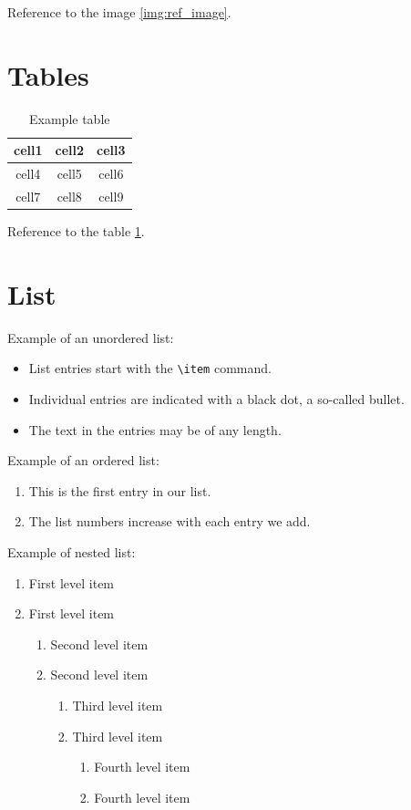 \documentclass[a4paper, oneside]{book}
\begin{document}
Reference to the image \ref{img:ref_image}.

\section{Tables}
\begin{table}
\centering
\begin{tabular}{|c|c|c|} 
 \hline
 cell1 & cell2 & cell3 \\ \hline
 cell4 & cell5 & cell6 \\ \hline
 cell7 & cell8 & cell9 \\ \hline
\end{tabular}
\caption{Example table}
\label{tab:ref_table}
\end{table}

Reference to the table \ref{tab:ref_table}.

\section{List}
Example of an unordered list:
\begin{itemize}
  \item List entries start with the \verb|\item| command.
  \item Individual entries are indicated with a black dot, a so-called bullet.
  \item The text in the entries may be of any length.
\end{itemize}

Example of an ordered list:
\begin{enumerate}
  \item This is the first entry in our list.
  \item The list numbers increase with each entry we add.
\end{enumerate}

Example of nested list:
\begin{enumerate}
   \item First level item
   \item First level item
   \begin{enumerate}
     \item Second level item
     \item Second level item
     \begin{enumerate}
       \item Third level item
       \item Third level item
       \begin{enumerate}
         \item Fourth level item
         \item Fourth level item
       \end{enumerate}
     \end{enumerate}
   \end{enumerate}
 \end{enumerate}
\end{document}
